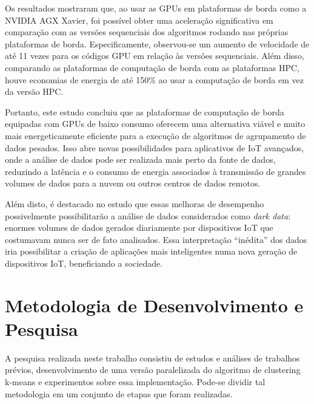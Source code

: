 \documentclass[12pt,
openright, 
oneside, %
a4paper,    %
brazil]{facom-ufu-abntex2}
\begin{document}
Os resultados mostraram que, ao usar as GPUs em plataformas de borda como a NVIDIA AGX Xavier, foi possível obter uma aceleração significativa em comparação com as versões sequenciais dos algoritmos rodando nas próprias plataformas de borda. Especificamente, observou-se um aumento de velocidade de até 11 vezes para os códigos GPU em relação às versões sequenciais. Além disso, comparando as plataformas de computação de borda com as plataformas HPC, houve economias de energia de até 150\% ao usar a computação de borda em vez da versão HPC.

Portanto, este estudo concluiu que as plataformas de computação de borda equipadas com GPUs de baixo consumo oferecem uma alternativa viável e muito mais energeticamente eficiente para a execução de algoritmos de agrupamento de dados pesados. Isso abre novas possibilidades para aplicativos de IoT avançados, onde a análise de dados pode ser realizada mais perto da fonte de dados, reduzindo a latência e o consumo de energia associados à transmissão de grandes volumes de dados para a nuvem ou outros centros de dados remotos.

Além disto, é destacado no estudo que essas melhoras de desempenho possivelmente possibilitarão a análise de dados considerados como \textit{dark data}: enormes volumes de dados gerados diariamente por dispositivos IoT que costumavam nunca ser de fato analisados. Essa interpretação \enquote{inédita} dos dados iria possibilitar a criação de aplicações mais inteligentes numa nova geração de dispositivos IoT, beneficiando a sociedade.





\chapter{Metodologia de Desenvolvimento e Pesquisa}



A pesquisa realizada neste trabalho consistiu de estudos e análises de trabalhos prévios, desenvolvimento de uma versão paralelizada do algoritmo de clustering k-means e experimentos sobre essa implementação. Pode-se dividir tal metodologia em um conjunto de etapas que foram realizadas.
\end{document}
